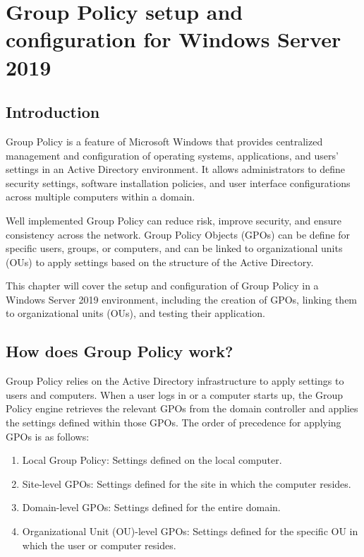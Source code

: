 \chapter{Group Policy setup and configuration for Windows Server 2019}

\section{Introduction}

Group Policy is a feature of Microsoft Windows that provides centralized management and configuration of operating systems, applications, and users' settings in an Active Directory environment. It allows administrators to define security settings, software installation policies, and user interface configurations across multiple computers within a domain.

Well implemented Group Policy can reduce risk, improve security, and ensure consistency across the network. Group Policy Objects (GPOs) can be define for specific users, groups, or computers, and can be linked to organizational units (OUs) to apply settings based on the structure of the Active Directory.

This chapter will cover the setup and configuration of Group Policy in a Windows Server 2019 environment, including the creation of GPOs, linking them to organizational units (OUs), and testing their application.

\section{How does Group Policy work?}

Group Policy relies on the Active Directory infrastructure to apply settings to users and computers. When a user logs in or a computer starts up, the Group Policy engine retrieves the relevant GPOs from the domain controller and applies the settings defined within those GPOs. The order of precedence for applying GPOs is as follows:
\begin{enumerate}
    \item Local Group Policy: Settings defined on the local computer.
    \item Site-level GPOs: Settings defined for the site in which the computer resides.
    \item Domain-level GPOs: Settings defined for the entire domain.
    \item Organizational Unit (OU)-level GPOs: Settings defined for the specific OU in which the user or computer resides. 
\end{enumerate}

